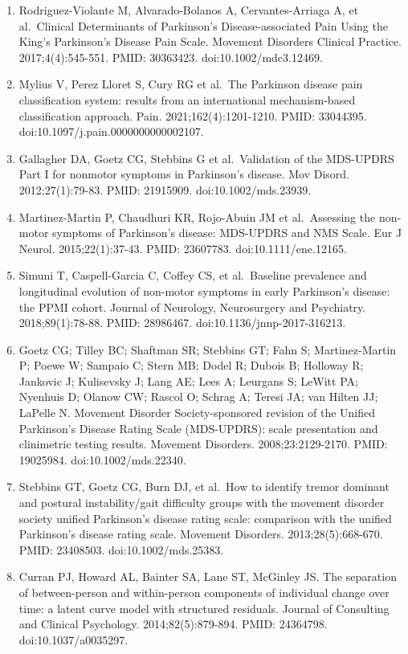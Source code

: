 \documentclass[
  english,
  12pt,
]{article}
\begin{document}
\begin{enumerate}
\item
  Rodriguez-Violante M, Alvarado-Bolanos A, Cervantes-Arriaga A, et al.~Clinical Determinants of Parkinson's Disease-associated Pain Using the King's Parkinson's Disease Pain Scale. Movement Disorders Clinical Practice. 2017;4(4):545-551. PMID: 30363423. doi:10.1002/mdc3.12469.
\item
  Mylius V, Perez Lloret S, Cury RG et al.~The Parkinson disease pain classification system: results from an international mechanism-based classification approach. Pain. 2021;162(4):1201-1210. PMID: 33044395. doi:10.1097/j.pain.0000000000002107.
\item
  Gallagher DA, Goetz CG, Stebbins G et al.~Validation of the MDS-UPDRS Part I for nonmotor symptoms in Parkinson's disease. Mov Disord. 2012;27(1):79-83. PMID: 21915909. doi:10.1002/mds.23939.
\item
  Martinez-Martin P, Chaudhuri KR, Rojo-Abuin JM et al.~Assessing the non-motor symptoms of Parkinson's disease: MDS-UPDRS and NMS Scale. Eur J Neurol. 2015;22(1):37-43. PMID: 23607783. doi:10.1111/ene.12165.
\item
  Simuni T, Caspell-Garcia C, Coffey CS, et al.~Baseline prevalence and longitudinal evolution of non-motor symptoms in early Parkinson's disease: the PPMI cohort. Journal of Neurology, Neurosurgery and Psychiatry. 2018;89(1):78-88. PMID: 28986467. doi:10.1136/jnnp-2017-316213.
\item
  Goetz CG; Tilley BC; Shaftman SR; Stebbins GT; Fahn S; Martinez-Martin P; Poewe W; Sampaio C; Stern MB; Dodel R; Dubois B; Holloway R; Jankovic J; Kulisevsky J; Lang AE; Lees A; Leurgans S; LeWitt PA; Nyenhuis D; Olanow CW; Rascol O; Schrag A; Teresi JA; van Hilten JJ; LaPelle N. Movement Disorder Society-sponsored revision of the Unified Parkinson's Disease Rating Scale (MDS-UPDRS): scale presentation and clinimetric testing results. Movement Disorders. 2008;23:2129-2170. PMID: 19025984. doi:10.1002/mds.22340.
\item
  Stebbins GT, Goetz CG, Burn DJ, et al.~How to identify tremor dominant and postural instability/gait difficulty groups with the movement disorder society unified Parkinson's disease rating scale: comparison with the unified Parkinson's disease rating scale. Movement Disorders. 2013;28(5):668-670. PMID: 23408503. doi:10.1002/mds.25383.
\item
  Curran PJ, Howard AL, Bainter SA, Lane ST, McGinley JS. The separation of between-person and within-person components of individual change over time: a latent curve model with structured residuals. Journal of Consulting and Clinical Psychology. 2014;82(5):879-894. PMID: 24364798. doi:10.1037/a0035297.

\end{enumerate}
\end{document}
